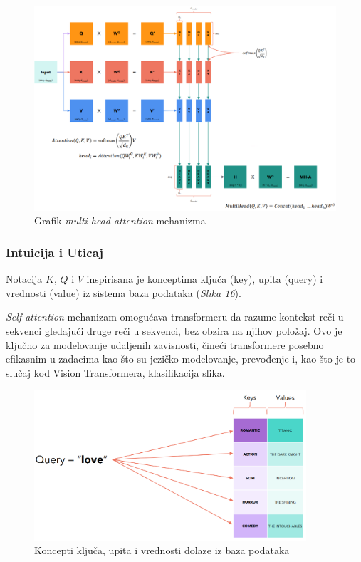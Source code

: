 \documentclass[12pt]{article}
\begin{document}
   \newpage
   \begin{figure}[h!]
      \hspace{-2cm} %
      \vspace{-0.5cm} %
      \includegraphics[width=1.3\textwidth]{mha.png}
      \caption{Grafik \textit{multi-head attention} mehanizma \cite{transformer}}
      \label{fig:mha}
   \end{figure}

   \subsubsection*{Intuicija i Uticaj}

   Notacija $K$, $Q$ i $V$ inspirisana je konceptima ključa (key), upita (query) i 
   vrednosti (value) iz sistema baza podataka (\textit{Slika 16}).

   \textit{Self-attention} mehanizam omogućava transformeru da razume kontekst reči u sekvenci 
   gledajući druge reči u sekvenci, bez obzira na njihov položaj. 
   Ovo je ključno za modelovanje udaljenih zavisnosti, čineći transformere posebno efikasnim u 
   zadacima kao što su jezičko modelovanje, prevođenje i, kao što je to slučaj kod 
   Vision Transformera, klasifikacija slika.

   \newpage
   \begin{figure}[h!]
      \centering
      \vspace{-1cm} %
      \includegraphics[width=0.9\textwidth]{dict.png}
      \caption{Koncepti ključa, upita i vrednosti dolaze iz baza podataka \cite{transformer}}
      \label{fig:trans_inspiration}
   \end{figure}
\end{document}
